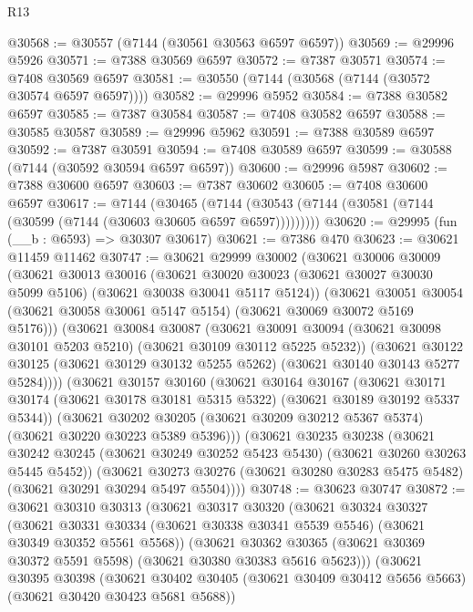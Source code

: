 \begin{lexlean}{R13}
\begin{coremodule}
@30568 := @30557 (@7144 (@30561 @30563 @6597 @6597))
@30569 := @29996 @5926
@30571 := @7388 @30569 @6597
@30572 := @7387 @30571
@30574 := @7408 @30569 @6597
@30581 := @30550 (@7144 (@30568 (@7144 (@30572 @30574 @6597 @6597))))
@30582 := @29996 @5952
@30584 := @7388 @30582 @6597
@30585 := @7387 @30584
@30587 := @7408 @30582 @6597
@30588 := @30585 @30587
@30589 := @29996 @5962
@30591 := @7388 @30589 @6597
@30592 := @7387 @30591
@30594 := @7408 @30589 @6597
@30599 := @30588 (@7144 (@30592 @30594 @6597 @6597))
@30600 := @29996 @5987
@30602 := @7388 @30600 @6597
@30603 := @7387 @30602
@30605 := @7408 @30600 @6597
@30617 := @7144
    (@30465 (@7144 (@30543 (@7144 (@30581 (@7144 (@30599 (@7144 (@30603 @30605 @6597 @6597)))))))))
@30620 := @29995 (fun (__b : @6593) => @30307 @30617)
@30621 := @7386 @470
@30623 := @30621 @11459 @11462
@30747 := @30621
    @29999
    @30002
    (@30621
      @30006
      @30009
      (@30621
        @30013
        @30016
        (@30621 @30020 @30023 (@30621 @30027 @30030 @5099 @5106) (@30621 @30038 @30041 @5117 @5124))
        (@30621
          @30051
          @30054
          (@30621 @30058 @30061 @5147 @5154)
          (@30621 @30069 @30072 @5169 @5176)))
      (@30621
        @30084
        @30087
        (@30621 @30091 @30094 (@30621 @30098 @30101 @5203 @5210) (@30621 @30109 @30112 @5225 @5232))
        (@30621
          @30122
          @30125
          (@30621 @30129 @30132 @5255 @5262)
          (@30621 @30140 @30143 @5277 @5284))))
    (@30621
      @30157
      @30160
      (@30621
        @30164
        @30167
        (@30621 @30171 @30174 (@30621 @30178 @30181 @5315 @5322) (@30621 @30189 @30192 @5337 @5344))
        (@30621
          @30202
          @30205
          (@30621 @30209 @30212 @5367 @5374)
          (@30621 @30220 @30223 @5389 @5396)))
      (@30621
        @30235
        @30238
        (@30621 @30242 @30245 (@30621 @30249 @30252 @5423 @5430) (@30621 @30260 @30263 @5445 @5452))
        (@30621
          @30273
          @30276
          (@30621 @30280 @30283 @5475 @5482)
          (@30621 @30291 @30294 @5497 @5504))))
@30748 := @30623 @30747
@30872 := @30621
    @30310
    @30313
    (@30621
      @30317
      @30320
      (@30621
        @30324
        @30327
        (@30621 @30331 @30334 (@30621 @30338 @30341 @5539 @5546) (@30621 @30349 @30352 @5561 @5568))
        (@30621
          @30362
          @30365
          (@30621 @30369 @30372 @5591 @5598)
          (@30621 @30380 @30383 @5616 @5623)))
      (@30621
        @30395
        @30398
        (@30621 @30402 @30405 (@30621 @30409 @30412 @5656 @5663) (@30621 @30420 @30423 @5681 @5688))

\end{coremodule}
\end{lexlean}
